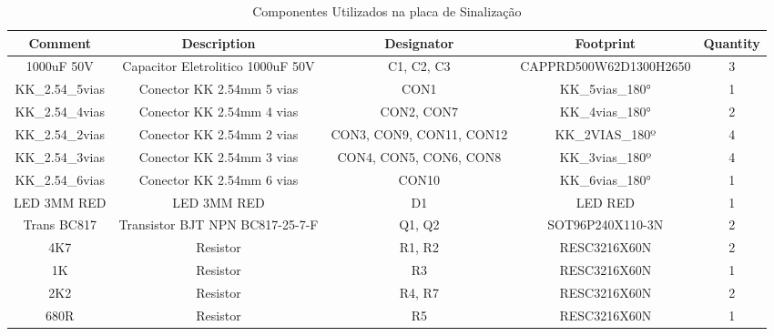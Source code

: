 \documentclass[../delivery_hospital_report.tex]{subfiles}
\begin{document}
\begin{table}[]
\caption{Componentes Utilizados na placa de Sinalização}
\centering
\begin{adjustbox}{width=\columnwidth,center}
\begin{tabular}{|c|c|c|c|c|}
\hline
Comment                   & Description                                  & Designator                & Footprint                 & Quantity \\ \hline
1000uF 50V                & Capacitor Eletrolitico 1000uF 50V            & C1, C2, C3                & CAPPRD500W62D1300H2650    & 3        \\ \hline
KK\_2.54\_5vias           & Conector KK 2.54mm 5 vias                    & CON1                      & KK\_5vias\_180°           & 1        \\ \hline
KK\_2.54\_4vias           & Conector KK 2.54mm 4 vias                    & CON2, CON7                & KK\_4vias\_180°           & 2        \\ \hline
KK\_2.54\_2vias           & Conector KK 2.54mm 2 vias                    & CON3, CON9, CON11, CON12  & KK\_2VIAS\_180º           & 4        \\ \hline
KK\_2.54\_3vias           & Conector KK 2.54mm 3 vias                    & CON4, CON5, CON6, CON8    & KK\_3vias\_180º           & 4        \\ \hline
KK\_2.54\_6vias           & Conector KK 2.54mm 6 vias                    & CON10                     & KK\_6vias\_180°           & 1        \\ \hline
LED 3MM RED               & LED 3MM RED                                  & D1                        & LED RED                   & 1        \\ \hline
Trans BC817               & Transistor BJT NPN BC817-25-7-F              & Q1, Q2                    & SOT96P240X110-3N          & 2        \\ \hline
4K7                       & Resistor                                     & R1, R2                    & RESC3216X60N              & 2        \\ \hline
1K                        & Resistor                                     & R3                        & RESC3216X60N              & 1        \\ \hline
2K2                       & Resistor                                     & R4, R7                    & RESC3216X60N              & 2        \\ \hline
680R                      & Resistor                                     & R5                        & RESC3216X60N              & 1        \\ \hline

\end{tabular}
\end{adjustbox}
\end{table}
\end{document}
